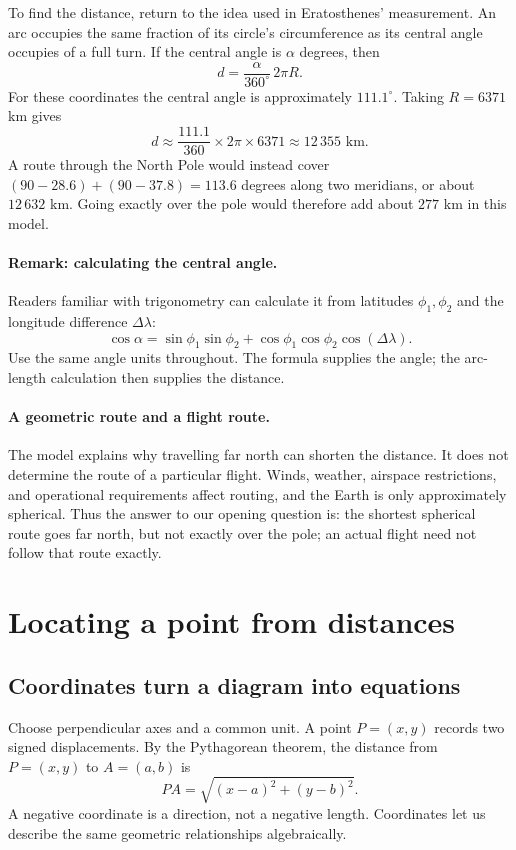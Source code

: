To find the distance, return to the idea used in Eratosthenes' measurement.
An arc occupies the same fraction of its circle's circumference as its
central angle occupies of a full turn. If the central angle is
$\alpha$ degrees, then
\[
 d=\frac{\alpha}{360^\circ}\,2\pi R.
\]
For these coordinates the central angle is approximately $111.1^\circ$.
Taking $R=6371$ km gives
\[
 d\approx\frac{111.1}{360}\times 2\pi\times6371
 \approx 12\,355\text{ km}.
\]
A route through the North Pole would instead cover
$(90-28.6)+(90-37.8)=113.6$ degrees along two meridians, or about
$12\,632$ km. Going exactly over the pole would therefore add about
$277$ km in this model.

\paragraph{Remark: calculating the central angle.}
Readers familiar with trigonometry can calculate it from latitudes
$\phi_1,\phi_2$ and the longitude difference $\Delta\lambda$:
\[
 \cos\alpha=\sin\phi_1\sin\phi_2+
 \cos\phi_1\cos\phi_2\cos(\Delta\lambda).
\]
Use the same angle units throughout. The formula supplies the angle;
the arc-length calculation then supplies the distance.

\paragraph{A geometric route and a flight route.}
The model explains why travelling far north can shorten the distance.
It does not determine the route of a particular flight. Winds, weather,
airspace restrictions, and operational requirements affect routing, and the
Earth is only approximately spherical. Thus the answer to our opening
question is: the shortest spherical route goes far north, but not exactly
over the pole; an actual flight need not follow that route exactly.


\section{Locating a point from distances}
\label{sec:geo-location}
\subsection{Coordinates turn a diagram into equations}
Choose perpendicular axes and a common unit. A point $P=(x,y)$ records
two signed displacements. By the Pythagorean theorem, the distance from
$P=(x,y)$ to $A=(a,b)$ is
\[
PA=\sqrt{(x-a)^2+(y-b)^2}.
\]
A negative coordinate is a direction, not a negative length. Coordinates
let us describe the same geometric relationships algebraically.

